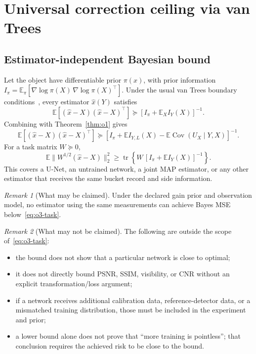 \documentclass[11pt]{article}
\newcommand{\Cov}{\operatorname{Cov}}
\newcommand{\tr}{\operatorname{tr}}
\newcommand{\E}{\mathbb{E}}
\theoremstyle{remark}
\newtheorem{remark}{Remark}
\begin{document}
\section{Universal correction ceiling via van Trees}
\label{sec:o3}
\subsection{Estimator-independent Bayesian bound}
\label{sec:o3-bound}
Let the object have differentiable prior $\pi(x)$, with prior information
$I_\pi = \E_\pi[\nabla\log\pi(X)\,\nabla\log\pi(X)^\top]$. Under the usual van
Trees boundary conditions~\cite{vantrees,tichavsky1998}, every estimator
$\widehat x(Y)$ satisfies
\begin{equation}
\E[(\widehat x - X)(\widehat x - X)^\top]
\succeq \left[ I_\pi + \E_X I_Y(X) \right]^{-1}.
\tag{O3.1}\label{eq:o3-vantrees}
\end{equation}
Combining with Theorem~\ref{thm:o1} gives
\begin{equation}
\E[(\widehat x - X)(\widehat x - X)^\top]
\succeq \left[ I_\pi + \E I_{Y,L}(X) - \E\Cov(U_X\mid Y,X) \right]^{-1}.
\tag{O3.2}\label{eq:o3-combined}
\end{equation}
For a task matrix $W\succeq0$,
\begin{equation}
\E\| W^{1/2}(\widehat x - X) \|_2^2
\ge \tr\!\left\{ W\,[ I_\pi + \E I_Y(X) ]^{-1} \right\}.
\tag{O3.3}\label{eq:o3-task}
\end{equation}
This covers a U-Net, an untrained network, a joint MAP estimator, or any other
estimator that receives the same bucket record and side information.

\begin{remark}[What may be claimed]
\label{rem:o3-may}
Under the declared gain prior and observation model, no estimator using the same
measurements can achieve Bayes MSE below~\eqref{eq:o3-task}.
\end{remark}

\begin{remark}[What may not be claimed]
\label{rem:o3-maynot}
The following are outside the scope of~\eqref{eq:o3-task}:
\begin{itemize}
\item the bound does not show that a particular network is close to optimal;
\item it does not directly bound PSNR, SSIM, visibility, or CNR without an
explicit transformation/loss argument;
\item if a network receives additional calibration data, reference-detector
data, or a mismatched training distribution, those must be included in the
experiment and prior;
\item a lower bound alone does not prove that ``more training is pointless'';
that conclusion requires the achieved risk to be close to the bound.
\end{itemize}
\end{remark}
\end{document}
